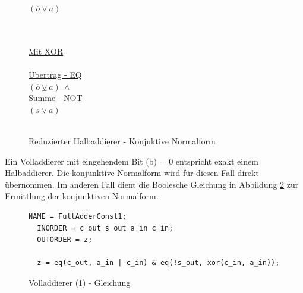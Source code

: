 \begin{figure}[!h]
\begin{minipage}[l]{3.5cm}
    $ (\overline{o} \vee  a) $\\
    ~\\
    ~
  \end{minipage}
  \begin{minipage}[l]{3.5cm}
    \underline{Mit XOR}\\
    ~\\
    \underline{Übertrag - EQ}\\
    $ (\overline{o} \veebar a) ~ \wedge $\\
    \underline{Summe - NOT}\\
    $ (s \veebar a) $\\
    ~
  \end{minipage}
  \caption{Reduzierter Halbaddierer - Konjuktive Normalform}
  \label{fig:red_halfadder_cnf}
\end{figure}

Ein Volladdierer mit eingehendem Bit (b) = 0 entspricht exakt einem Halbaddierer. Die konjunktive Normalform wird für diesen Fall direkt übernommen.
Im anderen Fall dient die Boolesche Gleichung in Abbildung \ref{fig:fulladder1_qen} zur Ermittlung der konjunktiven Normalform.
\begin{figure}[!h]
  \centering
  \begin{lstlisting}[]
  NAME = FullAdderConst1;
  INORDER = c_out s_out a_in c_in;
  OUTORDER = z;

  z = eq(c_out, a_in | c_in) & eq(!s_out, xor(c_in, a_in));
  \end{lstlisting}
  \caption{Volladdierer (1) - Gleichung}
  \label{fig:fulladder1_qen}
\end{figure}

